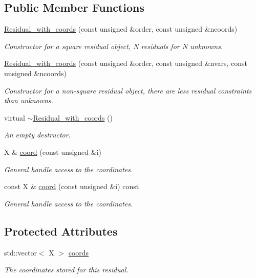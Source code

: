 \subsection*{Public Member Functions}
\begin{DoxyCompactItemize}
\item 
\hyperlink{classLuna_1_1Residual__with__coords_a61285d7e42d5ec57ba479e725cfd0340}{Residual\+\_\+with\+\_\+coords} (const unsigned \&order, const unsigned \&ncoords)
\begin{DoxyCompactList}\small\item\em Constructor for a square residual object, N residuals for N unknowns. \end{DoxyCompactList}\item 
\hyperlink{classLuna_1_1Residual__with__coords_aae68175ceb4157780d225d5e3d52bbbf}{Residual\+\_\+with\+\_\+coords} (const unsigned \&order, const unsigned \&nvars, const unsigned \&ncoords)
\begin{DoxyCompactList}\small\item\em Constructor for a non-\/square residual object, there are less residual constraints than unknowns. \end{DoxyCompactList}\item 
virtual \hyperlink{classLuna_1_1Residual__with__coords_ac10681ab24e23a4eabeb42f2001887d1}{$\sim$\+Residual\+\_\+with\+\_\+coords} ()
\begin{DoxyCompactList}\small\item\em An empty destructor. \end{DoxyCompactList}\item 
X \& \hyperlink{classLuna_1_1Residual__with__coords_a3fa4c950a944743c0380e4c151728372}{coord} (const unsigned \&i)
\begin{DoxyCompactList}\small\item\em General handle access to the coordinates. \end{DoxyCompactList}\item 
const X \& \hyperlink{classLuna_1_1Residual__with__coords_a6fca44ee46cbe0fee796f3d0cf43f74e}{coord} (const unsigned \&i) const
\begin{DoxyCompactList}\small\item\em General handle access to the coordinates. \end{DoxyCompactList}\end{DoxyCompactItemize}
\subsection*{Protected Attributes}
\begin{DoxyCompactItemize}
\item 
std\+::vector$<$ X $>$ \hyperlink{classLuna_1_1Residual__with__coords_a3f69e7026c7f86e14bc94ededc86ee62}{coords}
\begin{DoxyCompactList}\small\item\em The coordinates stored for this residual. \end{DoxyCompactList}\end{DoxyCompactItemize}
